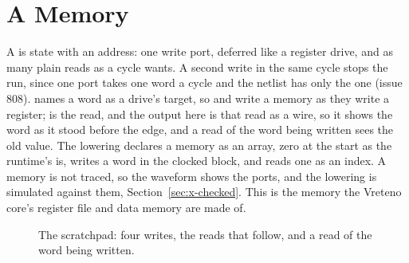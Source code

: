 \section{A Memory}
\label{sec:x-mem}

A  is state with an address: one write port, deferred
like a register drive, and as many plain reads as a cycle wants. A
second write in the same cycle stops the run, since one port takes one
word a cycle and the netlist has only the one (issue 808).
 names a word as a drive's target, so
 and  write a memory as they write a
register;  is the read, and the output here is
that read as a wire, so it shows the word as it stood before the
edge, and a read of the word being written sees the old value. The
lowering declares a memory as an array, zero at the start as the
runtime's is, writes a word in the clocked block, and reads one as an
index. A memory is not traced, so the waveform shows the ports, and
the lowering is simulated against them, Section~\ref{sec:x-checked}.
This is the memory the Vreteno core's register file and data memory
are made of.

\begin{figure}[htbp]
\centering

\caption{The scratchpad: four writes, the reads that follow, and a
read of the word being written.}
\label{fig:x-mem}
\end{figure}





